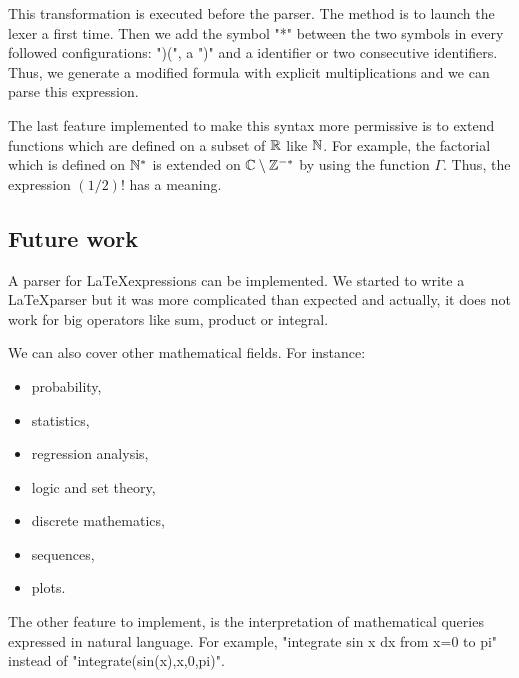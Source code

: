 This transformation is executed before the parser. The method is to launch the lexer a first time. Then we add the symbol "*" between the two symbols in every followed configurations: ")(", a ")" and a identifier or  two consecutive identifiers. Thus, we generate a modified formula with explicit multiplications and we can parse this expression.

The last feature implemented to make this syntax more permissive is to extend functions which are defined on a subset of $\mathbb{R}$ like $\mathbb{N}$. For example, the factorial which is defined on $\mathbb{N}^*$ is extended on $\mathbb{C}\setminus \mathbb{Z}^{-*}$ by using the function $\Gamma$. Thus, the expression $(1/2)!$ has a meaning.


\subsection{Future work}

A parser for \LaTeX expressions can be implemented. We started to write a \LaTeX parser but it was more complicated than expected and actually, it does not work for big operators like sum, product or integral.

We can also cover other mathematical fields. For instance:
\begin{itemize}
    \item probability,
    \item statistics,
    \item regression analysis,
    \item logic and set theory,
    \item discrete mathematics,
    \item sequences,
    \item plots.
\end{itemize}

The other feature to implement, is the interpretation of mathematical queries expressed in natural language. For example, "integrate sin x dx from x=0 to pi" instead of "integrate(sin(x),x,0,pi)".
